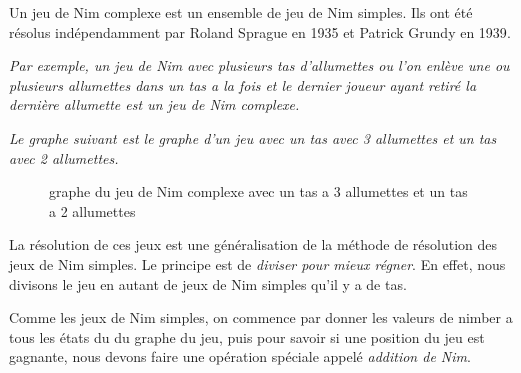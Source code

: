     Un jeu de Nim complexe est un ensemble de jeu de Nim simples. Ils ont été résolus indépendamment par Roland Sprague en 1935 et Patrick Grundy en 1939\cite{jfji}.

    \textit{
      Par exemple, un jeu de Nim avec plusieurs tas d'allumettes ou l'on enlève une ou plusieurs allumettes dans un tas a la fois et le dernier joueur ayant retiré la dernière allumette est un jeu de Nim complexe.
    }

    \textit{
      Le graphe suivant est le graphe d'un jeu avec un tas avec 3 allumettes et un tas avec 2 allumettes.
    }

     \begin{figure}[h]
      \centering
      \caption{graphe du jeu de Nim complexe avec un tas a 3 allumettes et un tas a 2 allumettes}
    \end{figure}

    La résolution de ces jeux est une généralisation de la méthode de résolution des jeux de Nim simples. Le principe est de \textit{diviser pour mieux régner}. En effet, nous divisons le jeu en autant de jeux de Nim simples qu'il y a de tas.

    Comme les jeux de Nim simples, on commence par donner les valeurs de nimber a tous les états du du graphe du jeu, puis pour savoir si une position du jeu est gagnante, nous devons faire une opération spéciale appelé \textit{addition de Nim}.

